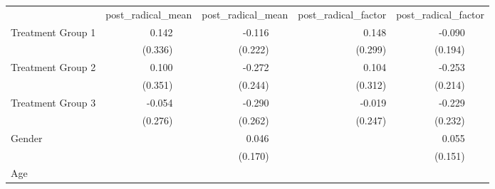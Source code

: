 \documentclass{article}
\begin{document}
\begin{table}[!h]
\centering
\begin{tabular}{llllllll}
\cline{1-8}
\multicolumn{1}{r}{} &
  \multicolumn{2}{c}{post\_radical\_mean} &
  \multicolumn{2}{c}{post\_radical\_mean} &
  \multicolumn{1}{c}{post\_radical\_factor} &
  \multicolumn{2}{c}{post\_radical\_factor} \\
\cline{1-8}
\multicolumn{1}{l}{Treatment Group 1} &
  \multicolumn{1}{r}{0.142} &
  \multicolumn{1}{l}{} &
  \multicolumn{1}{r}{-0.116} &
  \multicolumn{1}{l}{} &
  \multicolumn{1}{r}{0.148} &
  \multicolumn{1}{r}{-0.090} &
  \multicolumn{1}{l}{} \\
\multicolumn{1}{l}{} &
  \multicolumn{1}{r}{(0.336)} &
  \multicolumn{1}{l}{} &
  \multicolumn{1}{r}{(0.222)} &
  \multicolumn{1}{l}{} &
  \multicolumn{1}{r}{(0.299)} &
  \multicolumn{1}{r}{(0.194)} &
  \multicolumn{1}{l}{} \\
\multicolumn{1}{l}{Treatment Group 2} &
  \multicolumn{1}{r}{0.100} &
  \multicolumn{1}{l}{} &
  \multicolumn{1}{r}{-0.272} &
  \multicolumn{1}{l}{} &
  \multicolumn{1}{r}{0.104} &
  \multicolumn{1}{r}{-0.253} &
  \multicolumn{1}{l}{} \\
\multicolumn{1}{l}{} &
  \multicolumn{1}{r}{(0.351)} &
  \multicolumn{1}{l}{} &
  \multicolumn{1}{r}{(0.244)} &
  \multicolumn{1}{l}{} &
  \multicolumn{1}{r}{(0.312)} &
  \multicolumn{1}{r}{(0.214)} &
  \multicolumn{1}{l}{} \\
\multicolumn{1}{l}{Treatment Group 3} &
  \multicolumn{1}{r}{-0.054} &
  \multicolumn{1}{l}{} &
  \multicolumn{1}{r}{-0.290} &
  \multicolumn{1}{l}{} &
  \multicolumn{1}{r}{-0.019} &
  \multicolumn{1}{r}{-0.229} &
  \multicolumn{1}{l}{} \\
\multicolumn{1}{l}{} &
  \multicolumn{1}{r}{(0.276)} &
  \multicolumn{1}{l}{} &
  \multicolumn{1}{r}{(0.262)} &
  \multicolumn{1}{l}{} &
  \multicolumn{1}{r}{(0.247)} &
  \multicolumn{1}{r}{(0.232)} &
  \multicolumn{1}{l}{} \\
\multicolumn{1}{l}{Gender} &
  \multicolumn{1}{r}{} &
  \multicolumn{1}{l}{} &
  \multicolumn{1}{r}{0.046} &
  \multicolumn{1}{l}{} &
  \multicolumn{1}{r}{} &
  \multicolumn{1}{r}{0.055} &
  \multicolumn{1}{l}{} \\
\multicolumn{1}{l}{} &
  \multicolumn{1}{r}{} &
  \multicolumn{1}{l}{} &
  \multicolumn{1}{r}{(0.170)} &
  \multicolumn{1}{l}{} &
  \multicolumn{1}{r}{} &
  \multicolumn{1}{r}{(0.151)} &
  \multicolumn{1}{l}{} \\
\multicolumn{1}{l}{Age} &
  \multicolumn{1}{r}{} &
  \multicolumn{1}{l}{} &

\end{tabular}
\end{table}
\end{document}

